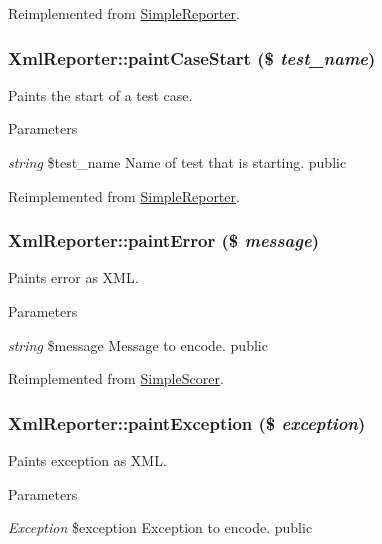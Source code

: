 Reimplemented from \hyperlink{class_simple_reporter_a8e6c0fb28e29920fe42eef652f822753}{SimpleReporter}.\hypertarget{class_xml_reporter_aebd11df8a848fa3f5b2d0d1b725249c1}{
\subsubsection[{paintCaseStart}]{\setlength{\rightskip}{0pt plus 5cm}XmlReporter::paintCaseStart (\$ {\em test\_\-name})}}
\label{class_xml_reporter_aebd11df8a848fa3f5b2d0d1b725249c1}
Paints the start of a test case. 
\begin{DoxyParams}{Parameters}
\item[{\em string}]\$test\_\-name Name of test that is starting.  public \end{DoxyParams}


Reimplemented from \hyperlink{class_simple_reporter_a987d5bbfa2cc927da394f6bc6053c23e}{SimpleReporter}.\hypertarget{class_xml_reporter_adf32d80f48cfbfc4dcad63397e45ca8d}{
\subsubsection[{paintError}]{\setlength{\rightskip}{0pt plus 5cm}XmlReporter::paintError (\$ {\em message})}}
\label{class_xml_reporter_adf32d80f48cfbfc4dcad63397e45ca8d}
Paints error as XML. 
\begin{DoxyParams}{Parameters}
\item[{\em string}]\$message Message to encode.  public \end{DoxyParams}


Reimplemented from \hyperlink{class_simple_scorer_ac33eeacd9e121f39874f95eec7219b88}{SimpleScorer}.\hypertarget{class_xml_reporter_a5525741fbc22b229dbc37de38df815cf}{
\subsubsection[{paintException}]{\setlength{\rightskip}{0pt plus 5cm}XmlReporter::paintException (\$ {\em exception})}}
\label{class_xml_reporter_a5525741fbc22b229dbc37de38df815cf}
Paints exception as XML. 
\begin{DoxyParams}{Parameters}
\item[{\em Exception}]\$exception Exception to encode.  public \end{DoxyParams}


